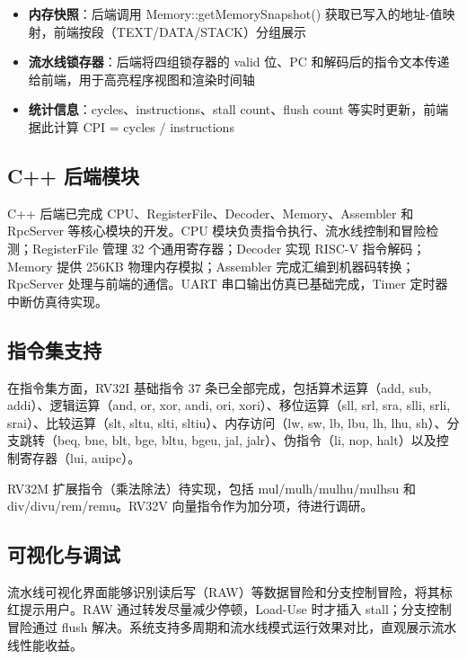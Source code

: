 \documentclass[12pt, a4paper]{article}
\begin{document}
\begin{itemize}
\item \textbf{内存快照}：后端调用 Memory::getMemorySnapshot() 获取已写入的地址-值映射，前端按段（TEXT/DATA/STACK）分组展示
\item \textbf{流水线锁存器}：后端将四组锁存器的 valid 位、PC 和解码后的指令文本传递给前端，用于高亮程序视图和渲染时间轴
\item \textbf{统计信息}：cycles、instructions、stall count、flush count 等实时更新，前端据此计算 CPI = cycles / instructions
\end{itemize}

\subsection{C++ 后端模块}

C++ 后端已完成 CPU、RegisterFile、Decoder、Memory、Assembler 和 RpcServer 等核心模块的开发。CPU 模块负责指令执行、流水线控制和冒险检测；RegisterFile 管理 32 个通用寄存器；Decoder 实现 RISC-V 指令解码；Memory 提供 256KB 物理内存模拟；Assembler 完成汇编到机器码转换；RpcServer 处理与前端的通信。UART 串口输出仿真已基础完成，Timer 定时器中断仿真待实现。

\subsection{指令集支持}

在指令集方面，RV32I 基础指令 37 条已全部完成，包括算术运算（add, sub, addi）、逻辑运算（and, or, xor, andi, ori, xori）、移位运算（sll, srl, sra, slli, srli, srai）、比较运算（slt, sltu, slti, sltiu）、内存访问（lw, sw, lb, lbu, lh, lhu, sh）、分支跳转（beq, bne, blt, bge, bltu, bgeu, jal, jalr）、伪指令（li, nop, halt）以及控制寄存器（lui, auipc）。

RV32M 扩展指令（乘法除法）待实现，包括 mul/mulh/mulhu/mulhsu 和 div/divu/rem/remu。RV32V 向量指令作为加分项，待进行调研。

\subsection{可视化与调试}

流水线可视化界面能够识别读后写（RAW）等数据冒险和分支控制冒险，将其标红提示用户。RAW 通过转发尽量减少停顿，Load-Use 时才插入 stall；分支控制冒险通过 flush 解决。系统支持多周期和流水线模式运行效果对比，直观展示流水线性能收益。

\vspace{1cm}
\end{document}
